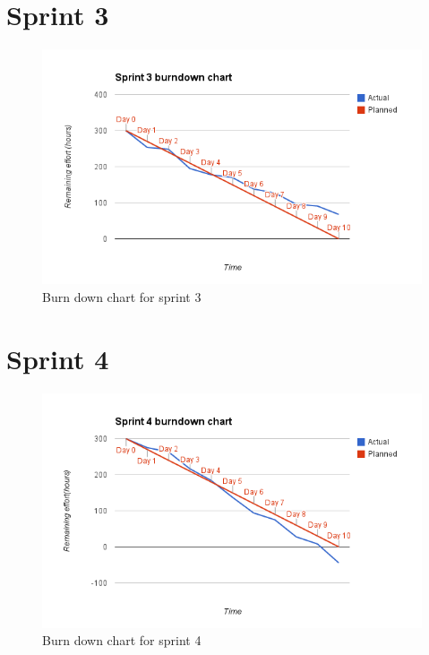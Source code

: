 \section{Sprint 3}
\begin{figure}[H]
\includegraphics[width=\textwidth]{appendix/backlog/burndown3.png}
\caption{Burn down chart for sprint 3}
\end{figure}


\section{Sprint 4}
\begin{figure}[H]
\includegraphics[width=\textwidth]{appendix/backlog/burndown4.png}
\caption{Burn down chart for sprint 4}
\end{figure}


